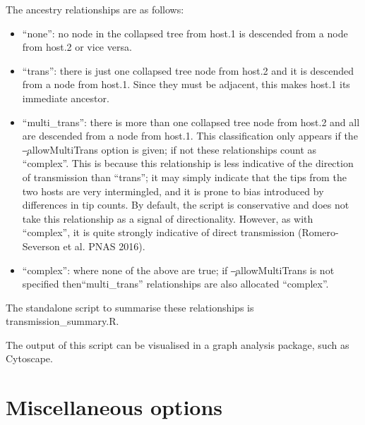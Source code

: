 The ancestry relationships are as follows:
\begin{itemize}
\item ``none'': no node in the collapsed tree from host.1 is descended from a node from host.2 or vice versa.
\item ``trans'': there is just one collapsed tree node from host.2 and it is descended from a node from host.1.
Since they must be adjacent, this makes host.1 its immediate ancestor.
\item ``multi\_trans'': there is more than one collapsed tree node from host.2 and all are descended from a node from host.1.
This classification only appears if the \c{--allowMultiTrans} option is given; if not these relationships count as ``complex''.
This is because this relationship is less indicative of the direction of transmission than ``trans''; it may simply indicate that the tips from the two hosts are very intermingled, and it is prone to bias introduced by differences in tip counts.
By default, the script is conservative and does not take this relationship as a signal of directionality.
However, as with ``complex'', it is quite strongly indicative of direct transmission (Romero-Severson et al. PNAS 2016).
\item ``complex'': where none of the above are true; if \c{--allowMultiTrans} is not specified then\break ``multi\_trans'' relationships are also allocated ``complex''.
\end{itemize}
The standalone script to summarise these relationships is transmission\_summary.R.

The output of this script can be visualised in a graph analysis package, such as Cytoscape.

\section{Miscellaneous options}

